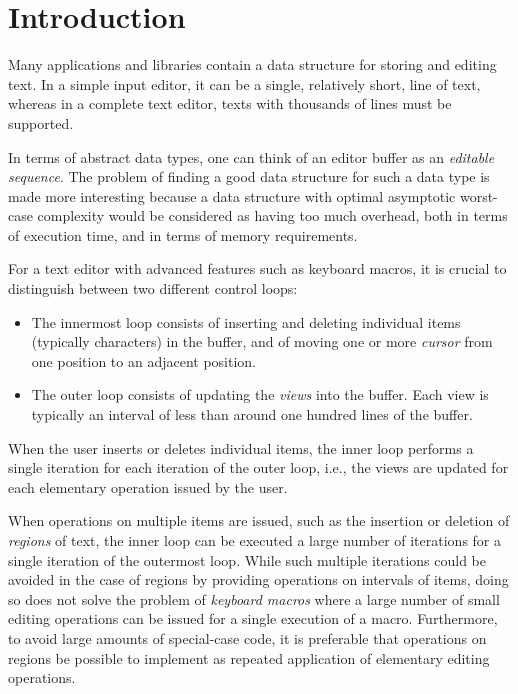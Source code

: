 \section{Introduction}

Many applications and libraries contain a data structure for storing
and editing text.  In a simple input editor, it can be a single,
relatively short, line of text, whereas in a complete text editor,
texts with thousands of lines must be supported.

In terms of abstract data types, one can think of an editor buffer as
an \emph{editable sequence}.  The problem of finding a good data
structure for such a data type is made more interesting because a data
structure with optimal asymptotic worst-case complexity would be
considered as having too much overhead, both in terms of execution
time, and in terms of memory requirements.

For a text editor with advanced features such as keyboard macros, it
is crucial to distinguish between two different control loops:

\begin{itemize}
\item The innermost loop consists of inserting and deleting individual
  items (typically characters) in the buffer, and of moving one or
  more \emph{cursor} from one position to an adjacent position.
\item The outer loop consists of updating the \emph{views} into the
  buffer.  Each view is typically an interval of less than around one
  hundred lines of the buffer.
\end{itemize}

When the user inserts or deletes individual items, the inner loop
performs a single iteration for each iteration of the outer loop,
i.e., the views are updated for each elementary operation issued by
the user.

When operations on multiple items are issued, such as the insertion or
deletion of \emph{regions} of text, the inner loop can be executed a
large number of iterations for a single iteration of the outermost
loop.  While such multiple iterations could be avoided in the case of
regions by providing operations on intervals of items, doing so does
not solve the problem of \emph{keyboard macros} where a large number
of small editing operations can be issued for a single execution of a
macro.  Furthermore, to avoid large amounts of special-case code, it
is preferable that operations on regions be possible to implement as
repeated application of elementary editing operations.

